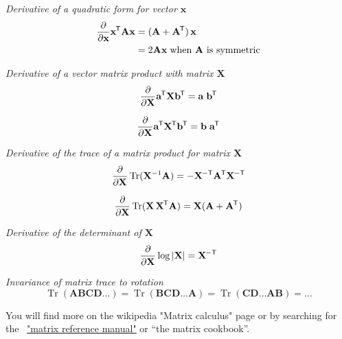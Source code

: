 \documentclass[11pt]{article}
\DeclareMathOperator{\Tr}{Tr}
\newcommand{\logdet}[1]{\log \left| {#1} \right| }
\newcommand{\xb}{\mathbf{x}}
\newcommand*{\tran}{^{\mkern-1.5mu\mathsf{T}}}
\newcommand*{\invtran}{^{\mkern-1.5mu\mathsf{-T}}}
\begin{document}
\begin{center}
\begin{minipage}{0.75\linewidth}
\textit{Derivative of a quadratic form for vector $\xb$}
\begin{equation}
	\begin{split}
	\frac{\partial}{\partial \xb} \xb\tran \mathbf{A} \xb &= (\mathbf{A} + \mathbf{A}\tran) \, \xb \\
	&= 2 \mathbf{A} \xb \; \text{when $\mathbf{A}$ is symmetric}
	\end{split}
\end{equation}

\textit{Derivative of a vector matrix product with matrix $\mathbf{X}$}
\begin{equation}
	\begin{split}
	\frac{\partial}{\partial \mathbf{X}} \mathbf{a}\tran \mathbf{X} \mathbf{b} \tran
    &= \mathbf{a}\; \mathbf{b}\tran \\
	\end{split}
\end{equation}

\begin{equation}
	\begin{split}
	\frac{\partial}{\partial \mathbf{X}} \mathbf{a}\tran \mathbf{X}\tran \mathbf{b} \tran
    &= \mathbf{b} \; \mathbf{a}\tran \\
	\end{split}
\end{equation}


\textit{Derivative of the trace of a matrix product for matrix $\mathbf{X}$}
\begin{equation}
	\frac{\partial}{\partial \mathbf{X}} \Tr(\mathbf{X}^{-1} \mathbf{A}) = -\mathbf{X}\invtran \mathbf{A}\tran \mathbf{X}\invtran
\end{equation}

\begin{equation}
	\frac{\partial}{\partial \mathbf{X}} \Tr(\mathbf{X} \, \mathbf{X}\tran \mathbf{A}) =
    \mathbf{X}(\mathbf{A} + \mathbf{A}\tran)
\end{equation}


\textit{Derivative of the determinant of $\mathbf{X}$}
\begin{equation}
	\frac{\partial}{\partial \mathbf{X}} \logdet{\mathbf{X}} = \mathbf{X}\invtran
\end{equation}

\textit{Invariance of matrix trace to rotation}
\begin{equation}
	\Tr(\mathbf{A} \mathbf{B} \mathbf{C} \mathbf{D} \ldots) = \Tr(\mathbf{B} \mathbf{C} \mathbf{D} \ldots \mathbf{A}) =
	\Tr(\mathbf{C} \mathbf{D} \ldots \mathbf{A}  \mathbf{B}) = \ldots
\end{equation}

You will find more on the wikipedia "Matrix calculus" page or by searching for the \
\href{http://www.ee.ic.ac.uk/hp/staff/dmb/matrix/intro.html}{"matrix reference manual"}
or ``the matrix cookbook''.
\end{minipage}
\end{center}
\end{document}
